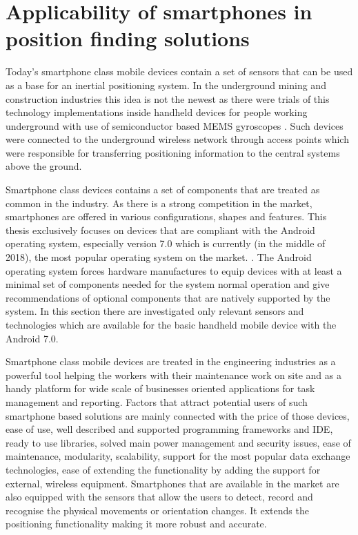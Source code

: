 \documentclass[../main.tex]{subfiles}
\begin{document}

\section{Applicability of smartphones in position finding solutions} %
\label{sec:mobile_device_dedicated_positioning_systems}

Today's smartphone class mobile devices contain a set of sensors that can be used as a base for an inertial positioning system. In the underground mining and construction industries this idea is not the newest as there were trials of this technology implementations inside handheld devices for people working underground with use of semiconductor based MEMS gyroscopes \cite{Thesis_CM}. Such devices were connected to the underground wireless network through access points which were responsible for transferring positioning information to the central systems above the ground.

Smartphone class devices contains a set of components that are treated as common in the industry. As there is a strong competition in the market, smartphones are offered in various configurations, shapes and features. This thesis exclusively focuses on devices that are compliant with the Android operating system, especially version 7.0 which is currently (in the middle of 2018), the most popular operating system on the market. \cite{android7.0_cdd}. The Android operating system forces hardware manufactures to equip devices with at least a minimal set of components needed for the system normal operation and give recommendations of optional components that are natively supported by the system\cite{android7.0_cdd}. In this section there are investigated only relevant sensors and technologies which are available for the basic handheld mobile device with the Android 7.0.

Smartphone class mobile devices are treated in the engineering industries as a powerful tool helping the workers with their maintenance work on site and as a handy platform for wide scale of businesses oriented applications for task management and reporting. Factors that attract potential users of such smartphone based solutions are mainly connected with the price of those devices, ease of use, well described and supported programming frameworks and IDE, ready to use libraries, solved main power management and security issues, ease of maintenance, modularity, scalability, support for the most popular data exchange technologies, ease of extending the functionality by adding the support for external, wireless equipment. Smartphones that are available in the market are also equipped with the sensors that allow the users to detect, record and recognise the physical movements or orientation changes. It extends the positioning functionality making it more robust and accurate\cite{article_Inertial-sensors-for-smartphones}\cite{article_inertial_test_smartphone}.
\end{document}
